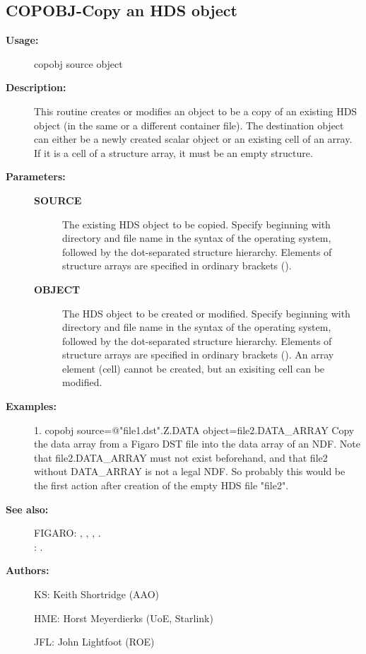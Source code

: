 \subsection{COPOBJ-\label{COPOBJ}Copy an HDS object}
\begin{description}

\item [\textbf{Usage:}]
 copobj source object

\item [\textbf{Description:}]
 This routine creates or modifies an object to be a copy of an
 existing HDS object (in the same or a different container file).
 The destination object can either be a newly created scalar object
 or an existing cell of an array. If it is a cell of a structure
 array, it must be an empty structure.

\item [\textbf{Parameters:}]
\begin{description}
\item [\textbf{SOURCE}]
 The existing HDS object to be copied. Specify beginning with
 directory and file name in the syntax of the operating system,
 followed by the dot-separated structure hierarchy. Elements of
 structure arrays are specified in ordinary brackets ().
\item [\textbf{OBJECT}]
 The HDS object to be created or modified. Specify beginning
 with directory and file name in the syntax of the operating
 system, followed by the dot-separated structure hierarchy.
 Elements of structure arrays are specified in ordinary brackets
 (). An array element (cell) cannot be created, but an exisiting
 cell can be modified.
\end{description}

\item [\textbf{Examples:}]
\begin{terminalv}
 1.  copobj source=@"file1.dst".Z.DATA object=file2.DATA_ARRAY
    Copy the data array from a Figaro DST file into the data array
    of an NDF. Note that file2.DATA_ARRAY must not exist
    beforehand, and that file2 without DATA_ARRAY is not a legal
    NDF. So probably this would be the first action after creation
    of the empty HDS file "file2".

\end{terminalv}

\item [\textbf{See also:}]
FIGARO: , , , .\\
: .\\

\item [\textbf{Authors:}]
 KS: Keith Shortridge (AAO)

 HME: Horst Meyerdierks (UoE, Starlink)

 JFL: John Lightfoot (ROE)
\end{description}
